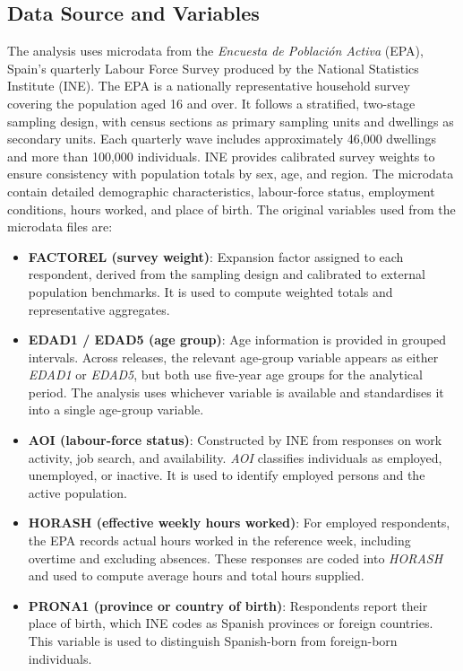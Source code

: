 \subsection*{Data Source and Variables}

The analysis uses microdata from the \textit{Encuesta de Población Activa} (EPA), Spain's quarterly Labour Force Survey produced by the National Statistics Institute (INE). The EPA is a nationally representative household survey covering the population aged 16 and over. It follows a stratified, two-stage sampling design, with census sections as primary sampling units and dwellings as secondary units. Each quarterly wave includes approximately 46{,}000 dwellings and more than 100{,}000 individuals. INE provides calibrated survey weights to ensure consistency with population totals by sex, age, and region. The microdata contain detailed demographic characteristics, labour-force status, employment conditions, hours worked, and place of birth. The original variables used from the microdata files are:

\begin{itemize}
    \item \textbf{FACTOREL (survey weight)}: Expansion factor assigned to each respondent, derived from the sampling design and calibrated to external population benchmarks. It is used to compute weighted totals and representative aggregates.

    \item \textbf{EDAD1 / EDAD5 (age group)}: Age information is provided in grouped intervals. Across releases, the relevant age-group variable appears as either \textit{EDAD1} or \textit{EDAD5}, but both use five-year age groups for the analytical period. The analysis uses whichever variable is available and standardises it into a single age-group variable.

    \item \textbf{AOI (labour-force status)}: Constructed by INE from responses on work activity, job search, and availability. \textit{AOI} classifies individuals as employed, unemployed, or inactive. It is used to identify employed persons and the active population.

    \item \textbf{HORASH (effective weekly hours worked)}: For employed respondents, the EPA records actual hours worked in the reference week, including overtime and excluding absences. These responses are coded into \textit{HORASH} and used to compute average hours and total hours supplied.

    \item \textbf{PRONA1 (province or country of birth)}: Respondents report their place of birth, which INE codes as Spanish provinces or foreign countries. This variable is used to distinguish Spanish-born from foreign-born individuals.
\end{itemize}


